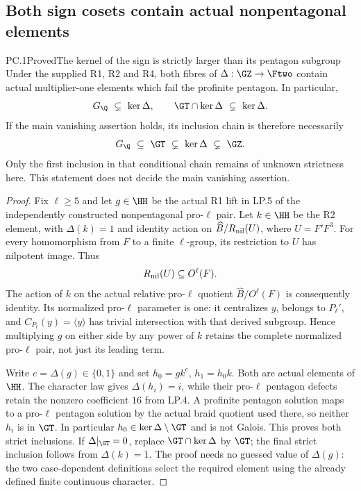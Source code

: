 \subsection{Both sign cosets contain actual nonpentagonal elements}

\begin{statement}{PC.1}{Proved}{The kernel of the sign is strictly larger than its pentagon subgroup}
Under the supplied R1, R2 and R4, both fibres of
$\Delta:\GZ\to\Ftwo$ contain actual multiplier-one elements
which fail the profinite pentagon. In particular,
\[
 G_{\Q}\ \subsetneq\ \ker\Delta,
 \qquad
 \GT\cap\ker\Delta\ \subsetneq\ \ker\Delta.
\]
If the main vanishing assertion holds, its inclusion chain is
therefore necessarily
\[
 G_{\Q}\ \subseteq\ \GT\ \subsetneq\ \ker\Delta
                       \ \subsetneq\ \GZ.
\]
Only the first inclusion in that conditional chain remains of
unknown strictness here. This statement does not decide the
main vanishing assertion.
\end{statement}
\begin{proof}
Fix $\ell\ge5$ and let $g\in\HH$ be the actual R1 lift in
LP.5 of the independently constructed nonpentagonal
pro-$\ell$ pair. Let $k\in\HH$ be the R2 element, with
$\Delta(k)=1$ and identity action on
$\widehat B/R_{\rm nil}(U)$, where $U=F'F^3$.
For every homomorphism from $F$ to a finite $\ell$-group,
its restriction to $U$ has nilpotent image. Thus
\[
 R_{\rm nil}(U)\subseteq O^\ell(F).
\]
The action of $k$ on the actual relative pro-$\ell$ quotient
$\widehat B/O^\ell(F)$ is consequently identity.
Its normalized pro-$\ell$ parameter is one: it centralizes
$y$, belongs to $P_\ell'$, and
$C_{P_\ell}(y)=\langle y\rangle$ has trivial intersection
with that derived subgroup. Hence multiplying $g$ on either
side by any power of $k$ retains the complete normalized
pro-$\ell$ pair, not just its leading term.

Write $e=\Delta(g)\in\{0,1\}$ and set
$h_0=gk^e$, $h_1=h_0k$. Both are actual elements of $\HH$.
The character law gives $\Delta(h_i)=i$, while their
pro-$\ell$ pentagon defects retain the nonzero coefficient
$16$ from LP.4. A profinite pentagon solution maps to a
pro-$\ell$ pentagon solution by the actual braid quotient
used there, so neither $h_i$ is in $\GT$.
In particular $h_0\in\ker\Delta\setminus\GT$ and is not
Galois. This proves both strict inclusions. If
$\Delta|_{\GT}=0$, replace $\GT\cap\ker\Delta$ by $\GT$;
the final strict inclusion follows from $\Delta(k)=1$.
The proof needs no guessed value of $\Delta(g)$: the two
case-dependent definitions select the required element
using the already defined finite continuous character.
\end{proof}
